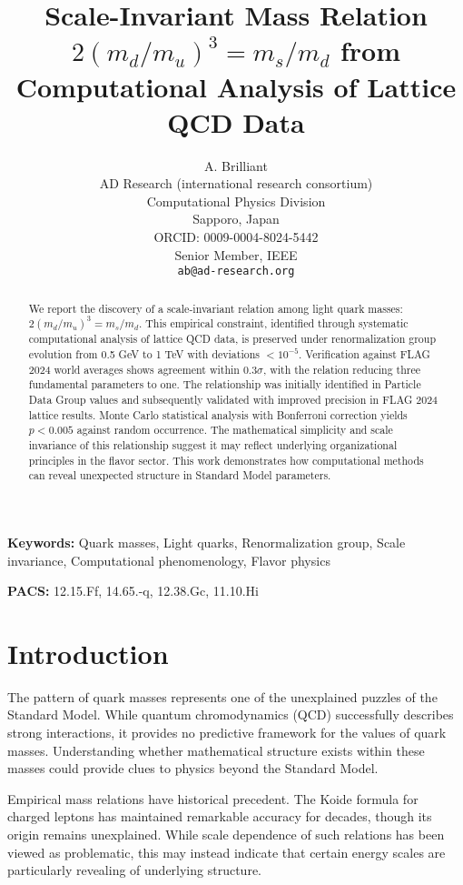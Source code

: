 \documentclass[12pt]{article}
\title{Scale-Invariant Mass Relation $2(m_d/m_u)^3 = m_s/m_d$ from Computational Analysis of Lattice QCD Data}
\author{A. Brilliant \\
\small AD Research (international research consortium) \\
\small Computational Physics Division \\
\small Sapporo, Japan \\
\small ORCID: 0009-0004-8024-5442 \\
\small Senior Member, IEEE \\
\small \texttt{ab@ad-research.org}}
\date{}
\begin{document}
\pagestyle{plain}

\maketitle


\begin{abstract}
We report the discovery of a scale-invariant relation among light quark masses: $2(m_d/m_u)^3 = m_s/m_d$. This empirical constraint, identified through systematic computational analysis of lattice QCD data, is preserved under renormalization group evolution from 0.5 GeV to 1 TeV with deviations $<10^{-5}$. Verification against FLAG 2024 world averages shows agreement within $0.3\sigma$, with the relation reducing three fundamental parameters to one. The relationship was initially identified in Particle Data Group values and subsequently validated with improved precision in FLAG 2024 lattice results. Monte Carlo statistical analysis with Bonferroni correction yields $p < 0.005$ against random occurrence. The mathematical simplicity and scale invariance of this relationship suggest it may reflect underlying organizational principles in the flavor sector. This work demonstrates how computational methods can reveal unexpected structure in Standard Model parameters.
\end{abstract}

\textbf{Keywords:} Quark masses, Light quarks, Renormalization group, Scale invariance, Computational phenomenology, Flavor physics

\textbf{PACS:} 12.15.Ff, 14.65.-q, 12.38.Gc, 11.10.Hi

\section{Introduction}
\label{sec:intro}

The pattern of quark masses represents one of the unexplained puzzles of the Standard Model. While quantum chromodynamics (QCD) successfully describes strong interactions, it provides no predictive framework for the values of quark masses. Understanding whether mathematical structure exists within these masses could provide clues to physics beyond the Standard Model.

Empirical mass relations have historical precedent. The Koide formula for charged leptons has maintained remarkable accuracy for decades, though its origin remains unexplained. While scale dependence of such relations has been viewed as problematic, this may instead indicate that certain energy scales are particularly revealing of underlying structure.
\end{document}
